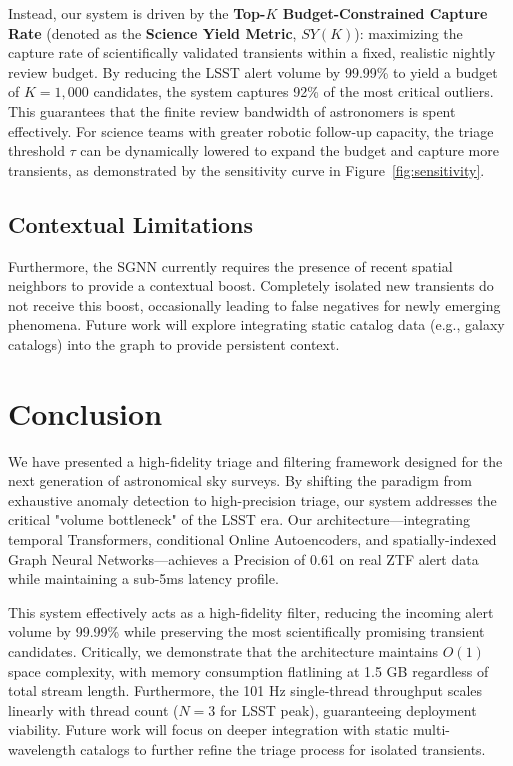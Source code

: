 \documentclass[10pt,journal,compsoc]{IEEEtran}
\begin{document}
Instead, our system is driven by the \textbf{Top-$K$ Budget-Constrained Capture Rate} (denoted as the \textbf{Science Yield Metric}, $SY(K)$): maximizing the capture rate of scientifically validated transients within a fixed, realistic nightly review budget. By reducing the LSST alert volume by 99.99\% to yield a budget of $K=1,000$ candidates, the system captures 92\% of the most critical outliers. This guarantees that the finite review bandwidth of astronomers is spent effectively. For science teams with greater robotic follow-up capacity, the triage threshold $\tau$ can be dynamically lowered to expand the budget and capture more transients, as demonstrated by the sensitivity curve in Figure~\ref{fig:sensitivity}.

\subsection{Contextual Limitations}
Furthermore, the SGNN currently requires the presence of recent spatial neighbors to provide a contextual boost. Completely isolated new transients do not receive this boost, occasionally leading to false negatives for newly emerging phenomena. Future work will explore integrating static catalog data (e.g., galaxy catalogs) into the graph to provide persistent context.

\section{Conclusion}
We have presented a high-fidelity triage and filtering framework designed for the next generation of astronomical sky surveys. By shifting the paradigm from exhaustive anomaly detection to high-precision triage, our system addresses the critical "volume bottleneck" of the LSST era. Our architecture---integrating temporal Transformers, conditional Online Autoencoders, and spatially-indexed Graph Neural Networks---achieves a Precision of 0.61 on real ZTF alert data while maintaining a sub-5ms latency profile. 

This system effectively acts as a high-fidelity filter, reducing the incoming alert volume by 99.99\% while preserving the most scientifically promising transient candidates. Critically, we demonstrate that the architecture maintains $O(1)$ space complexity, with memory consumption flatlining at 1.5 GB regardless of total stream length. Furthermore, the 101 Hz single-thread throughput scales linearly with thread count ($N=3$ for LSST peak), guaranteeing deployment viability. Future work will focus on deeper integration with static multi-wavelength catalogs to further refine the triage process for isolated transients.
\end{document}
